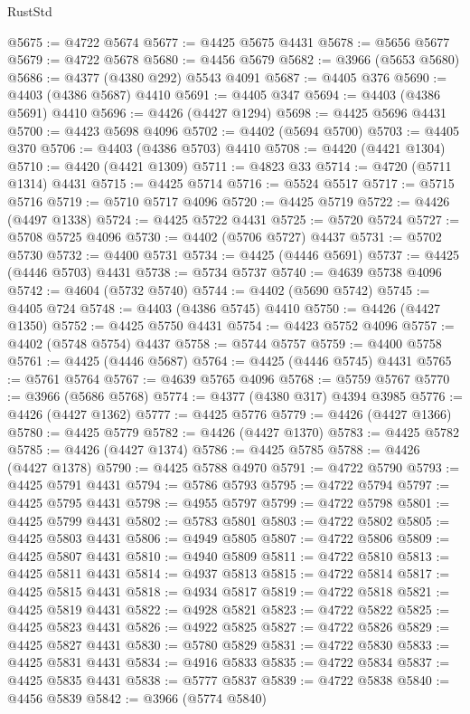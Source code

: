 \begin{lexlean}{RustStd}
\begin{coremodule}
@5675 := @4722 @5674
@5677 := @4425 @5675 @4431
@5678 := @5656 @5677
@5679 := @4722 @5678
@5680 := @4456 @5679
@5682 := @3966 (@5653 @5680)
@5686 := @4377 (@4380 @292) @5543 @4091
@5687 := @4405 @376
@5690 := @4403 (@4386 @5687) @4410
@5691 := @4405 @347
@5694 := @4403 (@4386 @5691) @4410
@5696 := @4426 (@4427 @1294)
@5698 := @4425 @5696 @4431
@5700 := @4423 @5698 @4096
@5702 := @4402 (@5694 @5700)
@5703 := @4405 @370
@5706 := @4403 (@4386 @5703) @4410
@5708 := @4420 (@4421 @1304)
@5710 := @4420 (@4421 @1309)
@5711 := @4823 @33
@5714 := @4720 (@5711 @1314) @4431
@5715 := @4425 @5714
@5716 := @5524 @5517
@5717 := @5715 @5716
@5719 := @5710 @5717 @4096
@5720 := @4425 @5719
@5722 := @4426 (@4497 @1338)
@5724 := @4425 @5722 @4431
@5725 := @5720 @5724
@5727 := @5708 @5725 @4096
@5730 := @4402 (@5706 @5727) @4437
@5731 := @5702 @5730
@5732 := @4400 @5731
@5734 := @4425 (@4446 @5691)
@5737 := @4425 (@4446 @5703) @4431
@5738 := @5734 @5737
@5740 := @4639 @5738 @4096
@5742 := @4604 (@5732 @5740)
@5744 := @4402 (@5690 @5742)
@5745 := @4405 @724
@5748 := @4403 (@4386 @5745) @4410
@5750 := @4426 (@4427 @1350)
@5752 := @4425 @5750 @4431
@5754 := @4423 @5752 @4096
@5757 := @4402 (@5748 @5754) @4437
@5758 := @5744 @5757
@5759 := @4400 @5758
@5761 := @4425 (@4446 @5687)
@5764 := @4425 (@4446 @5745) @4431
@5765 := @5761 @5764
@5767 := @4639 @5765 @4096
@5768 := @5759 @5767
@5770 := @3966 (@5686 @5768)
@5774 := @4377 (@4380 @317) @4394 @3985
@5776 := @4426 (@4427 @1362)
@5777 := @4425 @5776
@5779 := @4426 (@4427 @1366)
@5780 := @4425 @5779
@5782 := @4426 (@4427 @1370)
@5783 := @4425 @5782
@5785 := @4426 (@4427 @1374)
@5786 := @4425 @5785
@5788 := @4426 (@4427 @1378)
@5790 := @4425 @5788 @4970
@5791 := @4722 @5790
@5793 := @4425 @5791 @4431
@5794 := @5786 @5793
@5795 := @4722 @5794
@5797 := @4425 @5795 @4431
@5798 := @4955 @5797
@5799 := @4722 @5798
@5801 := @4425 @5799 @4431
@5802 := @5783 @5801
@5803 := @4722 @5802
@5805 := @4425 @5803 @4431
@5806 := @4949 @5805
@5807 := @4722 @5806
@5809 := @4425 @5807 @4431
@5810 := @4940 @5809
@5811 := @4722 @5810
@5813 := @4425 @5811 @4431
@5814 := @4937 @5813
@5815 := @4722 @5814
@5817 := @4425 @5815 @4431
@5818 := @4934 @5817
@5819 := @4722 @5818
@5821 := @4425 @5819 @4431
@5822 := @4928 @5821
@5823 := @4722 @5822
@5825 := @4425 @5823 @4431
@5826 := @4922 @5825
@5827 := @4722 @5826
@5829 := @4425 @5827 @4431
@5830 := @5780 @5829
@5831 := @4722 @5830
@5833 := @4425 @5831 @4431
@5834 := @4916 @5833
@5835 := @4722 @5834
@5837 := @4425 @5835 @4431
@5838 := @5777 @5837
@5839 := @4722 @5838
@5840 := @4456 @5839
@5842 := @3966 (@5774 @5840)

\end{coremodule}
\end{lexlean}
